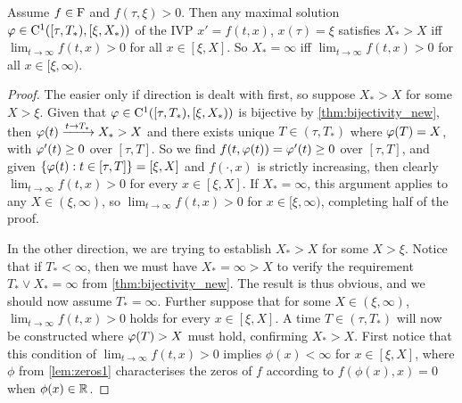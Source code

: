 \begin{lemma}\label{lem:spatial_unbound}
    Assume $f\in\mathrm{F}$ and $f(\tau,\xi)>0$. Then any maximal solution $\varphi\in\mathrm{C}^1([\tau,T_*),[\xi,X_*))$ of the IVP $x'=f(t,x)$, $x(\tau)=\xi$ satisfies $X_*>X$ iff $\lim_{t\to\infty}f(t,x)>0$ for all $x\in[\xi,X]$. So $X_*=\infty$ iff $\lim_{t\to\infty}f(t,x)>0$ for all $x\in[\xi,\infty)$.
\end{lemma}
\begin{proof}
    The easier only if direction is dealt with first, so suppose $X_*>X$ for some $X>\xi$. Given that $\varphi\in\mathrm{C}^1([\tau,T_*),[\xi,X_*))$ is bijective by \autoref{thm:bijectivity_new}, then $\varphi(t)\xrightarrow{t\to T_*}X_*>X$ and there exists unique $T\in(\tau,T_*)$ where $\varphi(T)=X$, with $\varphi'(t)\ge0$ over $[\tau,T]$. So we find $f(t,\varphi(t))= \varphi'(t)\ge0$ over $[\tau,T]$, and given $\{\varphi(t):t\in[\tau,T]\}=[\xi,X]$ and $f(\cdot,x)$ is strictly increasing, then clearly $\lim_{t\to\infty}f(t,x)>0$ for every $x\in[\xi,X]$. If $X_*=\infty$, this argument applies to any $X\in(\xi,\infty)$, so $\lim_{t\to\infty}f(t,x)>0$ for $x\in[\xi,\infty)$, completing half of the proof.

    In the other direction, we are trying to establish $X_*>X$ for some $X>\xi$. Notice that if $T_*<\infty$, then we must have $X_*=\infty>X$ to verify the requirement $T_*\vee X_*=\infty$ from \autoref{thm:bijectivity_new}. The result is thus obvious, and we should now assume $T_*=\infty$. Further suppose that for some $X\in(\xi,\infty)$, $\lim_{t\to\infty}f(t,x)>0$ holds for every $x\in[\xi,X]$. A time $T\in(\tau,T_*)$ will now be constructed where $\varphi(T)>X$ must hold, confirming $X_*>X$. First notice that this condition of $\lim_{t\to\infty}f(t,x)>0$ implies $\phi(x)<\infty$ for $x\in[\xi,X]$, where $\phi$ from \autoref{lem:zeros1} characterises the zeros of $f$ according to $f(\phi(x),x)=0$ when $\phi(x)\in\mathbb{R}$.


\end{proof}
